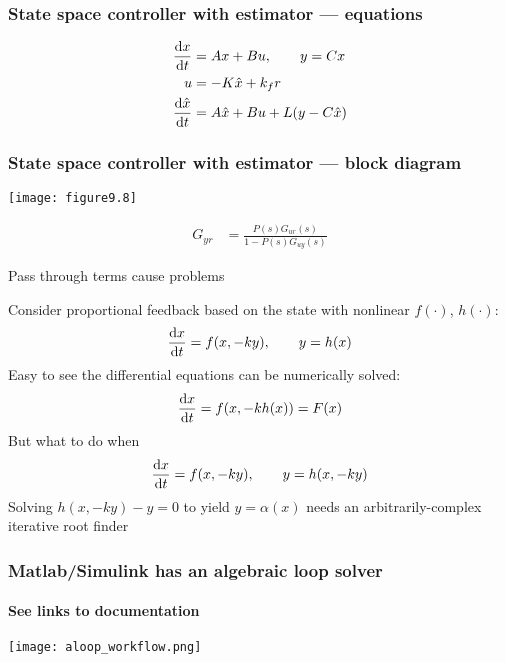 \documentclass{beamer-control}
\begin{document}
\begin{frame}
\frametitle{State space controller with estimator --- equations }

\begin{align}
\frac{\mathrm{d} x}{\mathrm{d} t} &= Ax + Bu, \qquad y = Cx \\
u &= -K \hat x + k_f r \\
\frac{\mathrm{d} \hat x}{\mathrm{d} t} &= A\hat x + Bu+L(y-C\hat x)
\end{align}

\end{frame}

\begin{frame}
\frametitle{State space controller with estimator --- block diagram}

\texttt{[image: figure9.8]}

\vspace*{0pt plus 1filll}
\begin{align}
G_{yr} &= \frac{P(s) G_{ur}(s)}{1 - P(s) G_{uy}(s)}
\end{align}


\end{frame}


\begin{frame}{Pass through terms cause problems}

Consider proportional feedback based on the state with nonlinear $f(\cdot)$, $h(\cdot)$:
\begin{align}
\frac{\mathrm{d} x}{\mathrm{d} t} = f(x,-ky), \qquad y = h(x)
\end{align}
Easy to see the differential equations can be numerically solved:
\begin{align}
\frac{\mathrm{d} x}{\mathrm{d} t} = f(x,-k h(x)) = F(x)
\end{align}
But what to do when
\begin{align}
\frac{\mathrm{d} x}{\mathrm{d} t} = f(x,-ky), \qquad y = h(x,-ky)
\end{align}
Solving $h(x,-ky)-y=0$ to yield $y=\alpha(x)$ needs an arbitrarily-complex iterative root finder

\end{frame}

\begin{frame}
\frametitle{Matlab/Simulink has an algebraic loop solver}
\framesubtitle{See links to documentation}
\centering
\texttt{[image: aloop\_workflow.png]}

\end{frame}


\SUMMARYFRAME
\FINALE
\end{document}
